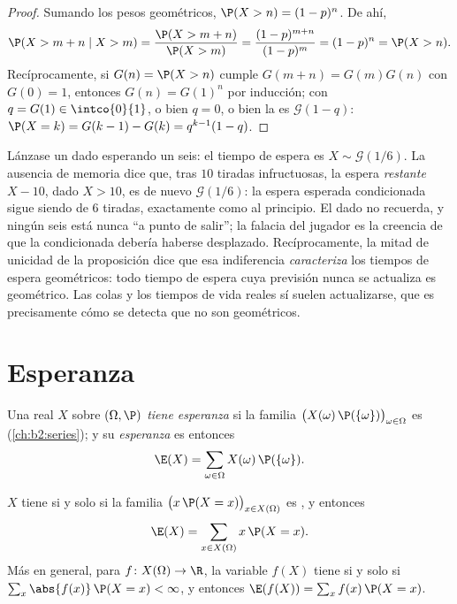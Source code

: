 \begin{proof}
Sumando los pesos geométricos, $\P(X > n) = (1-p)^n$. De ahí,
\[
\P(X > m + n \mid X > m)
= \frac{\P(X > m + n)}{\P(X > m)}
= \frac{(1-p)^{m+n}}{(1-p)^m} = (1-p)^n = \P(X > n).
\]
Recíprocamente, si $G(n) = \P(X > n)$ cumple $G(m + n) = G(m)G(n)$
con $G(0) = 1$, entonces $G(n) = G(1)^n$ por inducción; con $q =
G(1) \in \intco{0}{1}$, o bien $q = 0$, o bien la  es
$\mathcal{G}(1 - q)$: $\P(X = k) = G(k-1) - G(k) = q^{k-1}(1 - q)$.
\end{proof}

\begin{example}
Lánzase un dado esperando un seis: el tiempo de espera es $X \sim
\mathcal G(1/6)$. La ausencia de memoria dice que, tras $10$ tiradas
infructuosas, la espera \emph{restante} $X - 10$, dado $X > 10$, es
de nuevo $\mathcal G(1/6)$: la espera esperada condicionada sigue
siendo de $6$ tiradas, exactamente como al principio. El dado no
recuerda, y ningún seis está nunca ``a punto de salir''; la falacia
del jugador es la creencia de que la  condicionada debería
haberse desplazado. Recíprocamente, la mitad de unicidad de la
proposición dice que esa indiferencia \emph{caracteriza} los tiempos
de espera geométricos: todo tiempo de espera cuya previsión nunca se
actualiza es geométrico. Las colas y los tiempos de vida reales sí
suelen actualizarse, que es precisamente cómo se detecta que no son
geométricos.
\end{example}

\section{Esperanza}

\begin{definition}[Esperanza]\label{def:b2:randomvar:expectation}
Una  real $X$ sobre $(\Omega, \P)$ \emph{tiene
esperanza} si la familia
$\bigl(X(\omega)\,\P(\{\omega\})\bigr)_{\omega \in \Omega}$ es
 (\cref{ch:b2:series}); y su \emph{esperanza}
es entonces
\[
\E(X) = \sum_{\omega \in \Omega} X(\omega)\,\P(\{\omega\}) .
\]
\end{definition}

\begin{theorem}\label{thm:b2:randomvar:transfer}
$X$ tiene  si y solo si la familia $\bigl(x\,\P(X =
x)\bigr)_{x \in X(\Omega)}$ es , y entonces
\[
\E(X) = \sum_{x \in X(\Omega)} x\,\P(X = x) .
\]
Más en general, para $f \colon X(\Omega) \to \R$, la variable $f(X)$
tiene  si y solo si $\sum_x \abs{f(x)}\,\P(X = x) <
\infty$, y entonces $\E(f(X)) = \sum_x f(x)\,\P(X = x)$.
\end{theorem}

